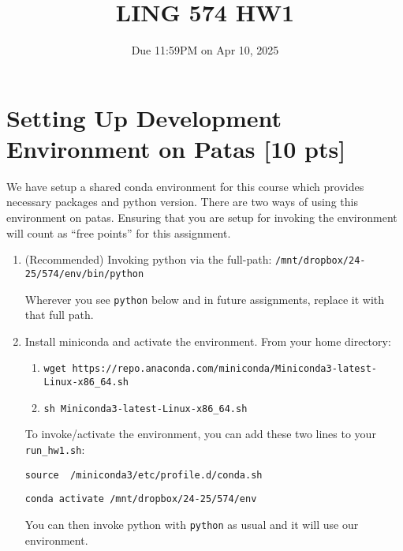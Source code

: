 \documentclass[11pt]{article}
\begin{document}
\title{LING 574 HW1}
\date{\vspace{-0.2in}Due 11:59PM on Apr 10, 2025}
\author{}
\maketitle



\section{Setting Up Development Environment on Patas [10 pts]}

We have setup a shared conda environment for this course which provides necessary packages and python version.  There are two ways of using this environment on patas.  Ensuring that you are setup for invoking the environment will count as ``free points'' for this assignment.
\begin{enumerate}
  \item (Recommended) Invoking python via the full-path:  \texttt{/mnt/dropbox/24-25/574/env/bin/python}
  
        Wherever you see \texttt{python} below and in future assignments, replace it with that full path.
  \item Install miniconda and activate the environment.  From your home directory:
    \begin{enumerate}
      \item \texttt{wget https://repo.anaconda.com/miniconda/Miniconda3-latest-Linux-x86\_64.sh}
      \item \texttt{sh Miniconda3-latest-Linux-x86\_64.sh}
    \end{enumerate}
    To invoke/activate the environment, you can add these two lines to your \texttt{run\_hw1.sh}: 

    \texttt{source ~/miniconda3/etc/profile.d/conda.sh}

    \texttt{conda activate /mnt/dropbox/24-25/574/env}

    You can then invoke python with \texttt{python} as usual and it will use our environment.
\end{enumerate}
\end{document}
